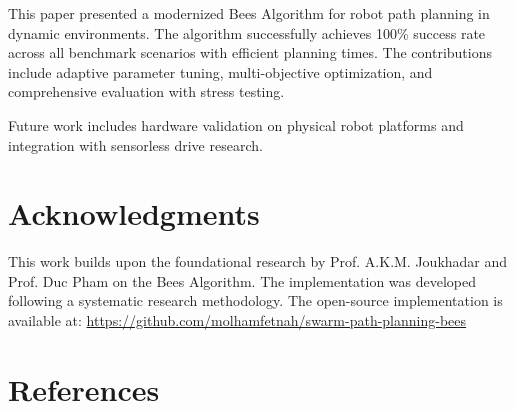 \documentclass[12pt]{article}
\begin{document}
This paper presented a modernized Bees Algorithm for robot path planning in dynamic environments. The algorithm successfully achieves 100\% success rate across all benchmark scenarios with efficient planning times. The contributions include adaptive parameter tuning, multi-objective optimization, and comprehensive evaluation with stress testing.

Future work includes hardware validation on physical robot platforms and integration with sensorless drive research.

\section*{Acknowledgments}

This work builds upon the foundational research by Prof. A.K.M. Joukhadar and Prof. Duc Pham on the Bees Algorithm. The implementation was developed following a systematic research methodology. The open-source implementation is available at: \url{https://github.com/molhamfetnah/swarm-path-planning-bees}

\section*{References}



\end{document}

